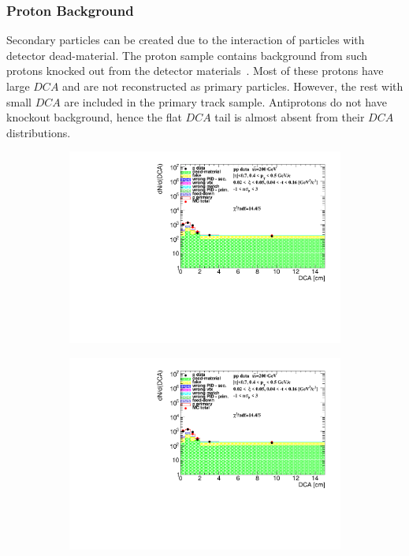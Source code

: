 \subsubsection{Proton Background}\label{section:star_background_proton}
Secondary particles can be created due to the interaction of particles with detector dead-material.
The proton sample contains background from such protons knocked out  from the detector materials~\cite{STAR:spectra}. Most of these protons have large $DCA$ and are not reconstructed as primary particles. However, the rest with small $DCA$  are included in the primary track sample. Antiprotons do not have knockout background, hence the flat $DCA$ tail is almost absent from their $DCA$ distributions.

\begin{figure}[htpb]
	\centering
	\begin{subfigure}{.47\textwidth}
		\includegraphics[width=\linewidth, page=1]{chapters/chrgSTAR/img/DCAproton/background_p_0.pdf}
	\end{subfigure}
	\begin{subfigure}{.47\textwidth}
		\includegraphics[width=\linewidth, page=2]{chapters/chrgSTAR/img/DCAproton/background_p_0.pdf}

\end{subfigure}
\end{figure}
